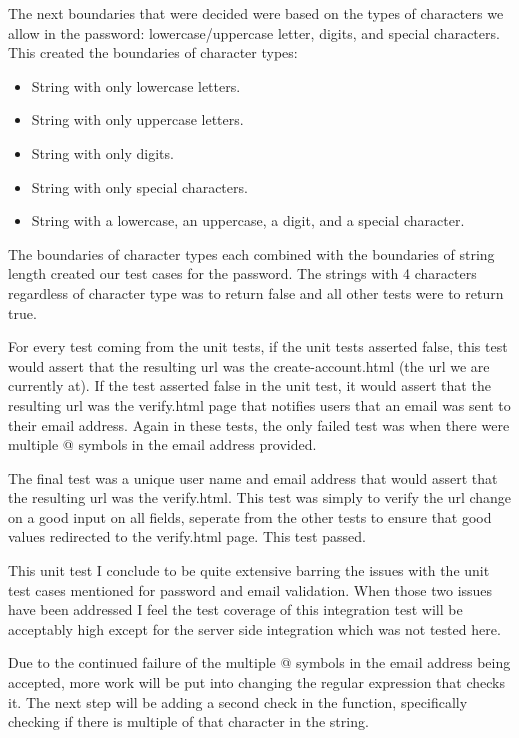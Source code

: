 \documentclass[a4paper]{article}
\begin{document}
The next boundaries that were decided were based on the types of characters we allow in the password: lowercase/uppercase letter, digits, and special characters.
This created the boundaries of character types:

\begin{itemize}
   \item String with only lowercase letters.
   \item String with only uppercase letters.
   \item String with only digits.
   \item String with only special characters.
   \item String with a lowercase, an uppercase, a digit, and a special character.
\end{itemize}

The boundaries of character types each combined with the boundaries of string length created our test cases for the password.
The strings with 4 characters regardless of character type was to return false and all other tests were to return true.

For every test coming from the unit tests, if the unit tests asserted false, this test would assert that the resulting url was the create-account.html (the url we are currently at).
If the test asserted false in the unit test, it would assert that the resulting url was the verify.html page that notifies users that an email was sent to their email address.
Again in these tests, the only failed test was when there were multiple @ symbols in the email address provided.

The final test was a unique user name and email address that would assert that the resulting url was the verify.html.
This test was simply to verify the url change on a good input on all fields, seperate from the other tests to ensure that good values redirected to the verify.html page.
This test passed.

This unit test I conclude to be quite extensive barring the issues with the unit test cases mentioned for password and email validation.
When those two issues have been addressed I feel the test coverage of this integration test will be acceptably high except for the server side integration which was not tested here.

Due to the continued failure of the multiple @ symbols in the email address being accepted, more work will be put into changing the regular expression that checks it.
The next step will be adding a second check in the function, specifically checking if there is multiple of that character in the string.
\end{document}
